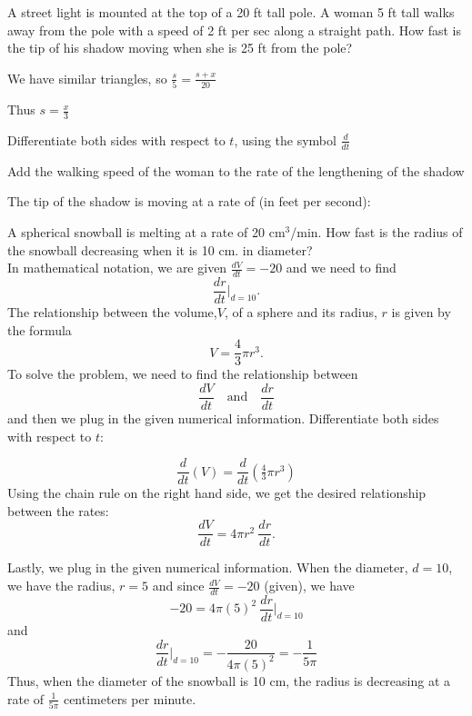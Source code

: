\documentclass{ximera}
\begin{document}
\begin{question}
A street light is mounted at the top of a 20 ft tall pole.  
A woman 5 ft tall walks away from the pole with a speed of 2 ft per sec along a straight path.  
How fast is the tip of his shadow moving when she is 25 ft from
the pole?
\begin{hint}
We have similar triangles, so $\frac{s}{5}=\frac{s+x}{20}$
\end{hint}
\begin{hint}
Thus $s=\frac{x}{3}$
\end{hint}
\begin{hint}
Differentiate both sides with respect to $t$, using the symbol $\frac{d}{dt}$
\end{hint}
\begin{hint}
Add the walking speed of the woman to the rate of the lengthening of the shadow
\end{hint}

The tip of the shadow is moving at a rate of (in feet per second):
\begin{multipleChoice}
\end{multipleChoice}
\end{question}


\begin{example}
A spherical snowball is melting at a rate of 20 cm$^3$/min. How fast is the radius of the snowball
decreasing when it is 10 cm. in diameter?\\
In mathematical notation, we are given $\frac{dV}{dt} = -20$ and we need to find
\[\frac{dr}{dt}\bigg|_{d = 10}.\]
The relationship between the volume,$V$, of a sphere and its radius, $r$ is given by the formula 
\[V = \frac43 \pi r^3.\]
To solve the problem, we need to find the relationship between 
\[\frac{dV}{dt} \quad \text{and} \quad \frac{dr}{dt}\]
and then we plug in the given numerical information.
Differentiate both sides with respect to $t$:




\[\frac{d}{dt} (V) = \frac{d}{dt}(\tfrac43 \pi r^3)\]
Using the chain rule on the right hand side, we get the desired relationship between the rates:
\[\frac{dV}{dt}  = 4\pi r^2 \  \frac{dr}{dt}.\]

Lastly, we plug in the given numerical information. When the diameter,  $d = 10$, we have the radius, $r = 5$ and since $\frac{dV}{dt}=-20$ (given), we have
\[-20  = 4\pi (5)^2 \ \frac{dr}{dt}\bigg|_{d = 10}\]
and
\[\frac{dr}{dt}\bigg|_{d = 10} = -\frac{20}{4\pi (5)^2} = -\frac{1}{5\pi} \]
Thus, when the diameter of the snowball is  10 cm, the radius is decreasing at a rate of $\frac{1}{5\pi}$ centimeters per minute.
\end{example}
\end{document}
